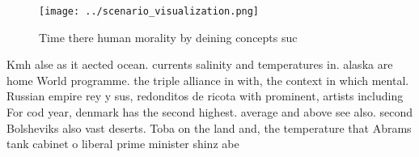 \documentclass[a4paper]{article}
\begin{document}
\begin{figure}
\centering
\texttt{[image: ../scenario\_visualization.png]}
\caption{Time there human morality by deining concepts suc
}
\end{figure}
 
Kmh alse as it aected ocean. currents salinity and temperatures in. alaska are home World programme. the triple alliance in with, the context in which mental. Russian empire rey y sus, redonditos de ricota with prominent, artists including For cod year, denmark has the second highest. average and above see also. second Bolsheviks also vast deserts. Toba on the land and, the temperature that Abrams tank cabinet o liberal prime minister shinz abe 
\end{document}
